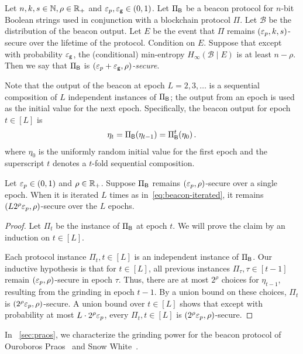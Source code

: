 \begin{definition}\label{def:beacon-security}
    Let $n,k,s \in \mathbb{N}, \rho \in \mathbb{R}_+$ and $\mathsf{\varepsilon}_p, \mathsf{\varepsilon_g} \in (0,1)$.
    Let $\Pi_{\mathsf{B}}$ be a beacon protocol for $n$-bit Boolean strings 
    used in conjunction with a blockchain protocol $\Pi$. 
    Let $\mathcal{B}$ be the distribution of the beacon output.
    Let $E$ be the event that $\Pi$ remains $(\mathsf{\varepsilon}_p, k, s)$-secure over the lifetime of the protocol. 
    Condition on $E$. 
    Suppose that except with probability $\mathsf{\varepsilon_g}$, 
    the (conditional) min-entropy 
    $H_\infty(\mathcal{B} \mid E)$ is at least $n - \rho$. 
    Then we say that $\Pi_{\mathsf{B}}$ is \emph{$(\mathsf{\varepsilon}_p + \mathsf{\varepsilon_g}, \rho)$-secure}.
\end{definition}



Note that the output of the beacon at epoch $L = 2, 3, \ldots$  
is a sequential composition of $L$ independent instances of $\Pi_{\mathsf{B}}$; 
the output from an epoch is used as the initial value for the next epoch. 
Specifically, 
the beacon output for epoch $t \in [L]$ is 
\begin{align}\label{eq:beacon-iterated}
    \eta_t = \Pi_{\mathsf{B}}(\eta_{t-1}) = \Pi_{\mathsf{B}}^t(\eta_0)\,.
\end{align}
where $\eta_0$ is the uniformly random initial value for the first epoch 
and the superscript $t$ denotes a $t$-fold sequential composition.


\begin{lemma}\label{lemma:beacon-composition}
Let $\mathsf{\varepsilon}_p \in (0,1)$ and $\rho \in \mathbb{R}_+$.
Suppose $\Pi_{\mathsf{B}}$ remains $(\mathsf{\varepsilon}_p, \rho)$-secure over a single epoch. 
When it is iterated $L$ times as in~\eqref{eq:beacon-iterated}, 
it remains $\left(L 2^\rho \mathsf{\varepsilon}_p, \rho\right)$-secure 
over the $L$ epochs.
\end{lemma}
\begin{proof}
    Let $\Pi_t$ be the instance of $\Pi_{\mathsf{B}}$ at epoch $t$. 
    We will prove the claim by an induction on $t \in [L]$. 

    Each protocol instance $\Pi_t, t \in [L]$ 
    is an independent instance of $\Pi_{\mathsf{B}}$. 
    Our inductive hypothesis is that for $t \in [L]$, 
    all previous instances 
    $\Pi_\tau, \tau \in [t-1]$ remain $(\mathsf{\varepsilon}_p, \rho)$-secure in epoch $\tau$. 
    Thus, there are at most $2^\rho$ choices for $\eta_{t - 1}$, 
    resulting from the grinding in epoch $t-1$.
    By a union bound on these choices, $\Pi_t$ is $(2^\rho \mathsf{\varepsilon}_p, \rho)$-secure. 
    A union bound over $t \in [L]$ shows that 
    except with probability at most $L\cdot 2^\rho \mathsf{\varepsilon}_p$, 
    every $\Pi_t, t \in [L]$ is $(2^\rho \mathsf{\varepsilon}_p, \rho)$-secure.
\end{proof}


In \Section~\ref{sec:praos}, we characterize the grinding power 
for the beacon protocol of Ouroboros Praos~\cite{Praos} and Snow White~\cite{SnowWhite}.





